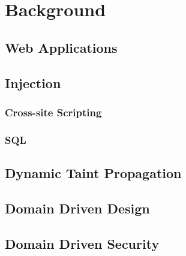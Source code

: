 \chapter{Background}


\section{Web Applications}

\section{Injection}
\subsection{Cross-site Scripting}
\subsection{SQL}

\section{Dynamic Taint Propagation}

\section{Domain Driven Design}

\section{Domain Driven Security}